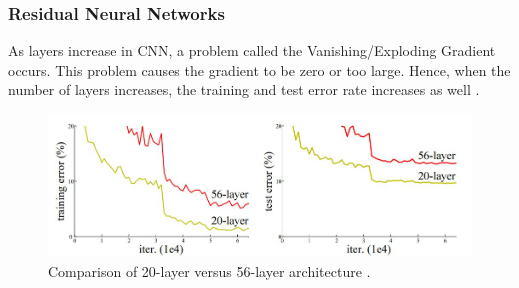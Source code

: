 \documentclass[12pt]{diazessay}
\begin{document}
    \subsubsection{Residual Neural Networks}
    \hspace{0.7cm} As layers increase in CNN, a problem called the Vanishing/Exploding Gradient occurs. This problem causes the gradient to be zero or too large. Hence, when the number of layers increases, the training and test error rate increases as well \cite{he2016deep}. 
    \begin{figure}[H]
        \centering
        \includegraphics[width=12cm]{CNN_Layers.jpg}
        \caption[Comparison of 20-layer versus 56-layer architecture]{Comparison of 20-layer versus 56-layer architecture \cite{he2016deep}.}
        \label{fig:CNN_Layers}
    \end{figure}
        
\end{document}
